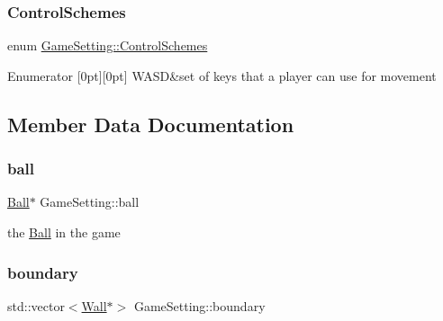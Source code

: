 \subsubsection{\texorpdfstring{Control\+Schemes}{ControlSchemes}}
{\footnotesize\ttfamily enum \mbox{\hyperlink{class_game_setting_aeff0cf4cbeffbd2a48db8ac3a06de9f4}{Game\+Setting\+::\+Control\+Schemes}}}

\begin{DoxyEnumFields}{Enumerator}
[0pt][0pt]{}\mbox{\label{class_game_setting_aeff0cf4cbeffbd2a48db8ac3a06de9f4a0c45dfc775ae5077d468bd53cbfff55e}} 
W\+A\+SD&set of keys that a player can use for movement \\
\hline

\end{DoxyEnumFields}


\subsection{Member Data Documentation}
\mbox{\label{class_game_setting_a68eac0fe358985c1a558eb31fd153322}} 
\subsubsection{\texorpdfstring{ball}{ball}}
{\footnotesize\ttfamily \mbox{\hyperlink{class_ball}{Ball}}$\ast$ Game\+Setting\+::ball\hspace{0.3cm}{\ttfamily [private]}}

the \mbox{\hyperlink{class_ball}{Ball}} in the game \mbox{\label{class_game_setting_a719b14dd396546b1a65f3ae123f3ade7}} 
\subsubsection{\texorpdfstring{boundary}{boundary}}
{\footnotesize\ttfamily std\+::vector$<$\mbox{\hyperlink{class_wall}{Wall}}$\ast$$>$ Game\+Setting\+::boundary\hspace{0.3cm}{\ttfamily [private]}}

